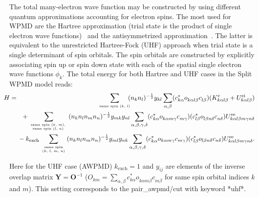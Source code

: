 \documentclass[a4paper,12pt]{article}
\begin{document}
The total many-electron wave function may be constructed by using different
quantum approximations accounting for electron spins. The most used for WPMD
are the Hartree approximation (trial state is the product of single electron
wave functions)~\cite{Klakow:JCP94} and the antisymmetrized approximation~\cite{Jakob:PRE07}. The
latter is equivalent to the unrestricted Hartree-Fock (UHF) approach when trial
state is a single determinant of spin orbitals. The spin orbitals are
constructed by explicitly associating spin up or spin down state with each of
the spatial single electron wave functions $\phi_k$. The total energy for both
Hartree and UHF cases in the Split WPMD model reads:
\begin{eqnarray}\label{TotalE}
\hspace*{-50pt}
H &=& \!\!\sum_{\mbox{\tiny same spin ($k$, $l$)}}\!\!
(n_kn_l)^{-\frac{1}{2}}y_{kl}\sum_{\alpha,\beta}(c^*_{k\alpha}o^{}_{k\alpha l\beta}c^{}_{l\beta})
(K^e_{k\alpha l\beta}+U^\mathrm{ei}_{k\alpha l\beta})  \nonumber\\
&& \hspace*{-8pt}
{} + \!\!\sum_{\mbox{\tiny \begin{tabular}{c}same spin ($k$, $m$),\\same spin ($l$, $n$)\end{tabular} }}\!\!
(n_kn_ln_mn_n)^{-\frac{1}{2}}y_{mk}y_{nl}\sum_{\alpha,\beta,\gamma,\delta}
(c^*_{k\alpha}o^{}_{k\alpha m\gamma}c^{}_{m\gamma})(c^*_{l\beta}o^{}_{l\beta n\delta}c^{}_{n\delta})
U^\mathrm{ee}_{k\alpha l\beta m\gamma n\delta} \nonumber\\
&& \hspace*{-8pt}
{} - k_\mathrm{exch}\!\!\sum_{\mbox{\tiny \begin{tabular}{c}same spin\\($k$, $l$, $m$, $n$)\end{tabular}}}\!\!
(n_kn_ln_mn_n)^{-\frac{1}{2}}y_{ml}y_{nk}\sum_{\alpha,\beta,\gamma,\delta}
(c^*_{k\alpha}o_{k\alpha m\gamma}c_{m\gamma})(c^*_{l\beta}o_{l\beta n\delta}c_{n\delta})
U^\mathrm{ee}_{k\alpha l\beta m\gamma n\delta}.
\end{eqnarray}

Here for the UHF case (AWPMD) $k_\mathrm{exch}=1$ and $y_{ij}$ are elements of the inverse
overlap matrix $\mathbf{Y} = \mathbf{O}^{-1}$
($O_{km}=\sum_{\alpha,\beta}c^*_{k\alpha}o^{}_{k\alpha m\beta}c^{}_{m\beta}$ for same
spin orbital indices $k$ and $m$). This setting corresponds to the pair\_awpmd/cut with keyword *uhf*.
\end{document}
